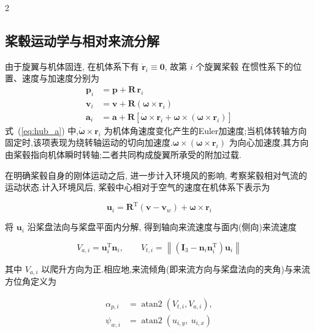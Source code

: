 \documentclass{aas}
\begin{document}
\begin{multicols}{2}
\subsection{桨毂运动学与相对来流分解}
\label{subsec:hub_kinematics}

由于旋翼与机体固连, 在机体系下有 $\dot{\bm{r}}_i\equiv\bm{0}$, 故第 $i$ 个旋翼桨毂
在惯性系下的位置、速度与加速度分别为
\begin{align}
\bm{p}_i&=\bm{p}+\bm{R}\,\bm{r}_i \label{eq:hub_p}\\[2pt]
\bm{v}_i&=\bm{v}+\bm{R}\left(\bm{\omega}\times\bm{r}_i\right) \label{eq:hub_v}\\[2pt]
\bm{a}_i&=\bm{a}+\bm{R}\left[\dot{\bm{\omega}}\times\bm{r}_i
+\bm{\omega}\times\left(\bm{\omega}\times\bm{r}_i\right)\right] \label{eq:hub_a}
\end{align}
式~(\ref{eq:hub_a}) 中,\(\dot{\bm\omega}\times\bm r_i\) 为机体角速度变化产生的Euler加速度;当机体转轴方向固定时,该项表现为绕转轴运动的切向加速度.\(\bm\omega\times(\bm\omega\times\bm r_i)\) 为向心加速度,其方向由桨毂指向机体瞬时转轴;二者共同构成旋翼所承受的附加过载.

在明确桨毂自身的刚体运动之后, 进一步计入环境风的影响, 考察桨毂相对气流的运动状态.计入环境风后, 桨毂中心相对于空气的速度在机体系下表示为

\begin{equation}
\bm{u}_i=\bm{R}^{\mathrm{T}}\left(\bm{v}-\bm{v}_w\right)+\bm{\omega}\times\bm{r}_i
\label{eq:u_hub}
\end{equation}

将 $\bm{u}_i$ 沿桨盘法向与桨盘平面内分解, 得到轴向来流速度与面内(侧向)来流速度

\begin{equation}
V_{a,i}=\bm{u}_i^{\mathrm{T}}\bm{n}_i,\qquad
V_{t,i}=\left\|\left(\bm{I}_3-\bm{n}_i\bm{n}_i^{\mathrm{T}}\right)\bm{u}_i\right\|
\label{eq:decompose}
\end{equation}

其中 $V_{a,i}$ 以爬升方向为正.相应地,来流倾角(即来流方向与桨盘法向的夹角)与来流方位角定义为

\begin{equation}
\begin{aligned}
\alpha_{p,i}&=\operatorname{atan2}\!\left(V_{t,i},V_{a,i}\right), \\
\psi_{w,i}&=\operatorname{atan2}\!\left(u_{i,y},\ u_{i,x}\right)
\end{aligned}
\label{eq:alpha_psiw}
\end{equation}


\end{multicols}
\end{document}

